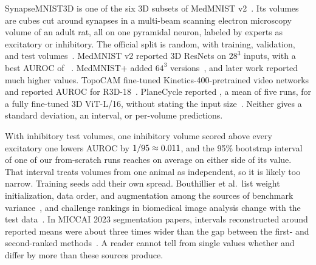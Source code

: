 \documentclass[conference]{IEEEtran}
\newif\ifanycitation
\let\citeAnyKey\cite
\renewcommand{\cite}{\global\anycitationtrue\citeAnyKey}
\begin{document}
SynapseMNIST3D is one of the six 3D subsets of MedMNIST v2~\cite{yang2023medmnist}. Its
volumes are cubes cut around synapses in a multi-beam scanning electron microscopy volume of
an adult rat, all on one pyramidal neuron, labeled by experts as excitatory or inhibitory. The official split is
random, with \nTrain{} training, \nVal{} validation, and \nTest{} test
volumes~\cite{yang2023medmnist}. MedMNIST v2 reported 3D ResNets on $28^3$ inputs, with a
best AUROC of \baseMedmnistAuroc{}~\cite{yang2023medmnist}. MedMNIST+ added $64^3$
versions~\cite{yang2024medmnistplus}, and later work reported much higher values.
TopoCAM fine-tuned Kinetics-400-pretrained video networks and reported AUROC
\baseTopoAuroc{} for R3D-18~\cite{nuwagira2026topocam}. PlaneCycle reported
\basePlaneAuroc{}, a mean of five runs, for a fully fine-tuned 3D ViT-L/16, without stating
the input size~\cite{yu2026planecycle}. Neither gives a standard deviation, an interval, or
per-volume predictions.

With \nTestInh{} inhibitory test volumes, one inhibitory volume scored above every
excitatory one lowers AUROC by $1/95{}\approx 0.011$, and the 95\% bootstrap
interval of one of our from-scratch runs reaches on average \halfWidthScratch{} on either
side of its value.
That interval treats volumes from one animal as independent, so it is likely too narrow.
Training seeds add their own spread. Bouthillier et al.\ list weight initialization, data
order, and augmentation among the sources of benchmark variance~\cite{bouthillier2021variance},
and challenge rankings in biomedical image analysis change with the test
data~\cite{maierhein2018rankings}. In MICCAI 2023 segmentation papers, intervals
reconstructed around reported means were about three times wider than the gap between the
first- and second-ranked methods~\cite{christodoulou2024confidence}. A reader cannot tell from single values whether
\baseTopoAuroc{} and \basePlaneAuroc{} differ by more than these sources produce.
\end{document}
